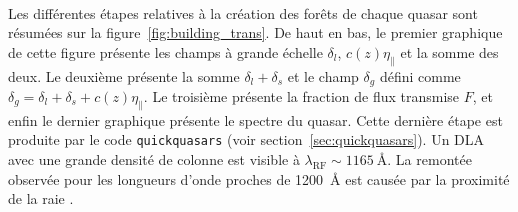 \paragraph{}

  Les différentes étapes relatives à la création des forêts de chaque quasar sont résumées sur la figure~\ref{fig:building_trans}. De haut en bas, le premier graphique de cette figure présente les champs à grande échelle $\delta_l$, $c(z)\eta_{\parallel}$ et la somme des deux. Le deuxième présente la somme $\delta_l + \delta_s$ et le champ $\delta_g$ défini comme $\delta_g = \delta_l + \delta_s + c(z) \eta_{\parallel}$. Le troisième présente la fraction de flux transmise $F$, et enfin le dernier graphique présente le spectre du quasar. Cette dernière étape est produite par le code \texttt{quickquasars} (voir section~\ref{sec:quickquasars}). Un DLA avec une grande densité de colonne est visible à $\lambda_{\mathrm{RF}} \sim \SI{1165}{\angstrom}$. La remontée observée pour les longueurs d'onde proches de \SI{1200}{\angstrom} est causée par la proximité de la raie \lya{}.
  


